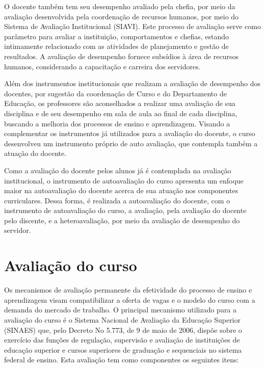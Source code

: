 O docente também tem seu desempenho avaliado pela chefia, por meio da avaliação desenvolvida pela coordenação de recursos humanos, por meio do Sistema de Avaliação Institucional (SIAVI). Este processo de avaliação serve como parâmetro para avaliar a instituição, comportamentos e chefias, estando intimamente relacionado com as atividades de planejamento e gestão de resultados. A avaliação de desempenho fornece subsídios à área de recursos humanos, considerando a capacitação e carreira dos servidores.


Além dos instrumentos institucionais que realizam a avaliação de desempenho dos docentes, por sugestão da coordenação de Curso e do Departamento de Educação, os professores são aconselhados a realizar uma avaliação de sua disciplina e de seu desempenho em sala de aula ao final de cada disciplina, buscando a melhoria dos processos de ensino e aprendizagem. Visando a complementar os instrumentos já utilizados para a avaliação do docente, o curso desenvolveu um instrumento próprio de auto avaliação, que contempla também a atuação do docente.

Como a avaliação do docente pelos alunos já é contemplada na avaliação institucional, o instrumento de autoavaliação do curso apresenta um enfoque maior na autoavaliação do docente acerca de sua atuação nos componentes curriculares. Dessa forma, é realizada a autoavaliação do docente, com o instrumento de autoavaliação do curso, a avaliação, pela avaliação do docente pelo discente, e a heteroavaliação, por meio da avaliação de desempenho do servidor.

\section{Avaliação do curso}

Os mecanismos de avaliação permanente da efetividade do processo de ensino e aprendizagem visam compatibilizar a oferta de vagas e o modelo do curso com a demanda do mercado de trabalho. O principal mecanismo utilizado para a avaliação do curso é o Sistema Nacional de Avaliação da Educação Superior (SINAES) que, pelo Decreto No 5.773, de 9 de maio de 2006, dispõe sobre o exercício das funções de regulação, supervisão e avaliação de instituições de educação superior e cursos superiores de graduação e sequenciais no sistema federal de ensino. Esta avaliação tem como componentes os seguintes itens:

